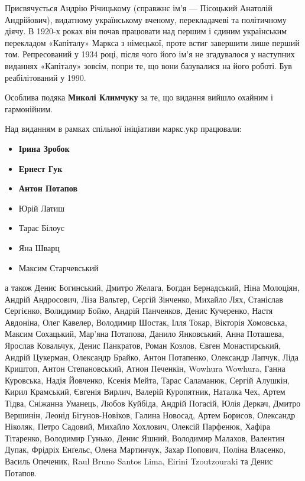 
Присвячується Андрію Річицькому (справжнє ім'я — Пісоцький Анатолій Андрійович), видатному українському вченому, перекладачеві та політичному діячу. В 1920-х роках він почав працювати над першим і єдиним українським перекладом «Капіталу» Маркса з німецької, проте встиг завершити лише перший том. Репресований у 1934 році, після чого його ім’я не згадувалося у наступних виданнях «Капіталу» зовсім, попри те, що вони базувалися на його роботі. Був реабілітований у 1990. 


\noindent{}Особлива подяка \textbf{Миколі Климчуку} за те,
що видання вийшло охайним і гармонійним. 

\smallskip
\noindent{}Над виданням в рамках спільної ініціативи маркс.укр працювали:
\begin{itemize}[nosep]
\item \textbf{Ірина Зробок}
\item \textbf{Ернест Гук}
\item \textbf{Антон Потапов}
\item Юрій Латиш
\item Тарас Білоус
\item Яна Шварц
\item Максим Старчевський
\end{itemize}
\noindent{}а також
Денис Богинський,
Дмитро Желага,
Богдан Бернадський,
Ніна Молоціян,
Андрій Андросович,
Ліза Вальтер,
Сергій Зінченко,
Михайло Лях,
Станіслав Сергієнко,
Волидимир Бойко,
Андрій Панченков,
Денис Кучеренко,
Настя Авдоніна,
Олег Кавелер,
Володимир Шостак,
Ілля Токар,
Вікторія Хомовська,
Максим Сохацький,
Мар'яна Потапова,
Данило Янковський,
Анна Поташева,
Ярослав Ковальчук,
Денис Панкратов,
Роман Козлов,
Євген Монастирський,
Андрій Цукерман,
Олександр Брайко,
Антон Потапенко,
Олександр Лапчук,
Ліда Криштоп,
Антон Степановський,
Атнон Печенкін,
Wowhura Wowhura,
Ганна Куровська,
Надія Йовченко,
Ксенія Мейта,
Тарас Саламанюк,
Сергій Алушкін,
Кирил Крамський,
Євгенія Вирлич,
Валерій Куропятник,
Наталка Чех,
Артем Тідва,
Сніжанна Уманець,
Любов Куйбіда,
Андрій Погасій,
Юлія Деркач,
Дмитро Вершинін,
Леонід Бігунов-Новіков,
Галина Новосад,
Артем Борисов,
Олександр Ніколяк,
Петро Садовий,
Михайло Хохлович,
Олексій Парфенюк,
Хафіра Тітаренко,
Володимир Гунько,
Денис Яшний,
Володимир Малахов,
Валентин Дупак,
Фрідріх Енґельс,
Олена Мартинчук,
Захар Попович,
Поліна Власенко,
Василь Опеченик,
Raul Bruno Santos Lima,
Eirini Tzoutzouraki та Денис Потапов.


\cleardoublepage